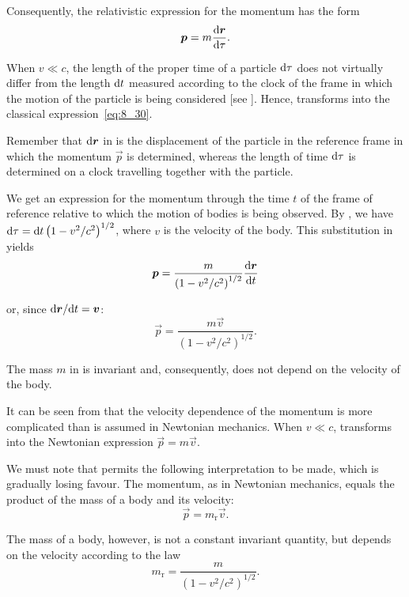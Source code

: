 \noindent
Consequently, the relativistic expression for the momentum has the form
\begin{equation}\label{eq:8_31}
	\boldsymbol{p} = m\frac{\mathrm{d}\boldsymbol{r}}{\mathrm{d}\tau}.
\end{equation}

\noindent
When $v\ll c$, the length of the proper time of a particle $\mathrm{d}\tau$ does not virtually differ from the length $\mathrm{d} t$ measured according to the clock of the frame in which the motion of the particle is being considered [see ]. Hence,  transforms into the classical expression~\eqref{eq:8_30}.

Remember that $\mathrm{d}\boldsymbol{r}$ in  is the displacement of the particle in the reference frame in which the momentum $\vec{p}$ is determined, whereas the length of time $\mathrm{d}\tau$ is determined on a clock travelling together with the particle.

We get an expression for the momentum through the time $t$ of the frame of reference relative to which the motion of bodies is being observed. By , we have $\mathrm{d}\tau=\mathrm{d} t\left(1-v^2/c^2\right)^{1/2}$, where $v$ is the velocity of the body. This substitution in  yields
\begin{equation*}
	\boldsymbol{p} = \frac{m}{\left(1-v^2/c^2\right)^{1/2}}\frac{\mathrm{d}\boldsymbol{r}}{\mathrm{d} t}
\end{equation*}

\noindent
or, since $\mathrm{d}\boldsymbol{r}/\mathrm{d} t=\boldsymbol{v}$:
\begin{equation}\label{eq:8_32}
	\vec{p} = \frac{m\vec{v}}{\left(1-v^2/c^2\right)^{1/2}}.
\end{equation}

The mass $m$ in  is invariant and, consequently, does not depend on the velocity of the body.

It can be seen from  that the velocity dependence of the momentum is more complicated than is assumed in Newtonian mechanics. When $v\ll c$,  transforms into the Newtonian expression $\vec{p}=m\vec{v}$.

We must note that  permits the following interpretation to be made, which is gradually losing favour. The momentum, as in Newtonian mechanics, equals the product of the mass of a body and its velocity:
\begin{equation}\label{eq:8_33}
	\vec{p} = m_{\text{r}}\vec{v}.
\end{equation}

\noindent
The mass of a body, however, is not a constant invariant quantity, but depends on the velocity according to the law
\begin{equation}\label{eq:8_34}
	m_{\text{r}} = \frac{m}{\left(1-v^2/c^2\right)^{1/2}}.
\end{equation}

